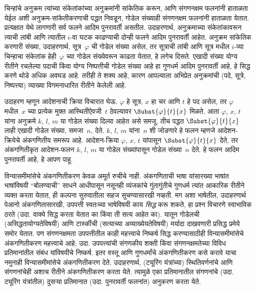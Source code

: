 चिन्हांचे अनुक्रम त्यांच्या संकेतांकांच्या अनुक्रमांनी सांकेतिक करून,
आणि संगणनक्षम फलनांनी हाताळता येईल अशी अनुक्रम-सांकेतीकरणाची पद्धत
निवडून, गोडेल संख्याही संगणनक्षम फलनांनी हाताळता येतात. प्रत्यक्षात
येथे लागणारी सर्व फलने आदिम पुनरावर्ती असतील. उदाहरणार्थ, अनुक्रमाच्या
संकेतांकावरून त्याची लांबी आणि त्यातील $i$-वा घटक काढण्याची दोन्ही
फलने आदिम पुनरावर्ती आहेत. अनुक्रम सांकेतिक करणारी संख्या, उदाहरणार्थ,
सूत्र~$\varphi$ ची गोडेल संख्या असेल, तर सूत्राची लांबी
आणि सूत्र मधील $i$-व्या चिन्हाचा संकेतांक हेही~$\varphi$ च्या
गोडेल संख्येवरून काढता येतात, हे लगेच दिसते. एखादी संख्या योग्य
रीतीने रचलेल्या पदाची किंवा योग्य निष्पत्तीची गोडेल संख्या
आहे हा गुणधर्म आदिम पुनरावर्ती आहे, हे सिद्ध करणे थोडे अधिक अवघड आहे.
तरीही ते शक्य आहे, कारण आपल्याला अभिप्रेत अनुक्रमांची (पदे,
सूत्रे, निष्पत्त्या) व्याख्या विगमनाधारित रीतीने केलेली आहे.

उदाहरण म्हणून आदेशनाची क्रिया विचारात घेऊ. $\varphi$ हे सूत्र, $x$ हा
चर आणि $t$ हे पद असेल, तर $\varphi$ मधील~$x$ च्या प्रत्येक मुक्त
आस्थितीऐवजी~$t$ ठेवल्यावर $\Subst{\varphi}{t}{x}$ मिळते. आता $\varphi$,
$x$, $t$ यांना अनुक्रमे $k$, $l$, $m$ या गोडेल संख्या दिल्या आहेत
असे समजू. तीच पद्धत $\Subst{\varphi}{t}{x}$ लाही एखादी गोडेल संख्या,
समजा~$n$, देते. $k$, $l$, $m$ यांना~$n$ शी जोडणारे हे फलन म्हणजे
आदेशन-क्रियेचे अंकगणितीय समरूप आहे. आदेशन-क्रिया $\varphi$, $x$, $t$
यांपासून $\Subst{\varphi}{t}{x}$ देते, तर अंकगणितीकृत आदेशन-फलन
$k$, $l$, $m$ या गोडेल संख्यांपासून गोडेल संख्या~$n$ देते.
हे फलन आदिम पुनरावर्ती आहे, हे आपण पाहू.

विन्यासमीमांसेचे अंकगणितीकरण केवळ अमूर्त रुचीचे नाही. अंकगणिताची
भाषा यांसारख्या भाषांत भाषांविषयी ``बोलण्याची'' साधने आधीपासून
नसूनही व्यंजकांचे गुंतागुंतीचे गुणधर्म त्यांत आकारिक रीतीने व्यक्त
करता येतात, ही कल्पना सुरुवातीला सहज सुचण्यासारखी नव्हती. मग
अशा भाषेतील, उदाहरणार्थ पेआनो अंकगणितासारखी, उपपत्ती स्वतःच्या
भाषेविषयी काय \emph{सिद्ध} करू शकते, हा प्रश्न विचारणे स्वाभाविक
ठरते (उदा. वाक्ये सिद्ध करता येतात का किंवा ती सत्य आहेत
का). यातून गोडेलची (असिद्धतायोग्यतेविषयी) आणि टार्स्कीची
(सत्याच्या अव्याख्येयतेविषयी) मर्यादा दाखवणारी प्रसिद्ध प्रमेये
समोर येतात. पण संगणनक्षमता उपपत्तीतील काही महत्त्वाचे निष्कर्ष
सिद्ध करण्यासाठीही विन्यासमीमांसेचे अंकगणितीकरण महत्त्वाचे आहे;
उदा. उपपत्त्यांची संगणकीय शक्ती किंवा संगणनक्षमतेच्या विविध
प्रतिमानांतील संबंध यांविषयीचे निष्कर्ष. इतर वस्तू आणि गुणधर्मांचे
अंकगणितीकरण कसे करावे याचा नमुनाही विन्यासमीमांसेचे अंकगणितीकरण
देते. उदाहरणार्थ, (ट्यूरिंग यंत्रांच्या) स्थितिवर्णनांचे आणि
संगणनांचेही अशाच रीतीने अंकगणितीकरण करता येते. त्यामुळे एका
प्रतिमानातील संगणनांचे (उदा. ट्यूरिंग यंत्रांतील) दुसऱ्या प्रतिमानात
(उदा. पुनरावर्ती फलनांत) अनुकरण करता येते.











